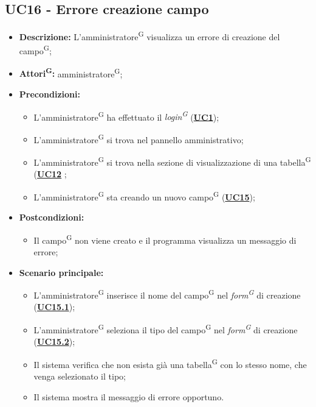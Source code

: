 \subsection{UC16 - Errore creazione campo}
\label{sec:UC16}
\begin{itemize}
	\item \textbf{Descrizione:} L’amministratore\textsuperscript{G} visualizza un errore di creazione del campo\textsuperscript{G};
	\item \textbf{Attori\textsuperscript{G}:} amministratore\textsuperscript{G};
	\item \textbf{Precondizioni:} 
	\begin{itemize}
		\item L’amministratore\textsuperscript{G} ha effettuato il \textit{login\textsuperscript{G}} (\hyperref[sec:UC1]{\textbf{UC1}});
		\item L’amministratore\textsuperscript{G} si trova nel pannello amministrativo;
		\item L’amministratore\textsuperscript{G} si trova nella sezione di visualizzazione di una tabella\textsuperscript{G} (\hyperref[sec:UC12]{\textbf{UC12}} ;
		\item L’amministratore\textsuperscript{G} sta creando un nuovo campo\textsuperscript{G} (\hyperref[sec:UC15]{\textbf{UC15}});
	\end{itemize}
	\item \textbf{Postcondizioni:} 
	\begin{itemize}
		\item Il campo\textsuperscript{G} non viene creato e il programma visualizza un messaggio di errore;
	\end{itemize}
	\item \textbf{Scenario principale:} 
	\begin{itemize}
		\item L’amministratore\textsuperscript{G} inserisce il nome del campo\textsuperscript{G} nel \textit{form\textsuperscript{G}} di creazione (\hyperref[sec:UC15.1]{\textbf{UC15.1}});
		\item L’amministratore\textsuperscript{G} seleziona il tipo del campo\textsuperscript{G} nel \textit{form\textsuperscript{G}} di creazione (\hyperref[sec:UC15.2]{\textbf{UC15.2}});
		\item Il sistema verifica che non esista già una tabella\textsuperscript{G} con lo stesso nome, che venga selezionato il tipo;
		\item Il sistema mostra il messaggio di errore opportuno.
	\end{itemize}
\end{itemize}

